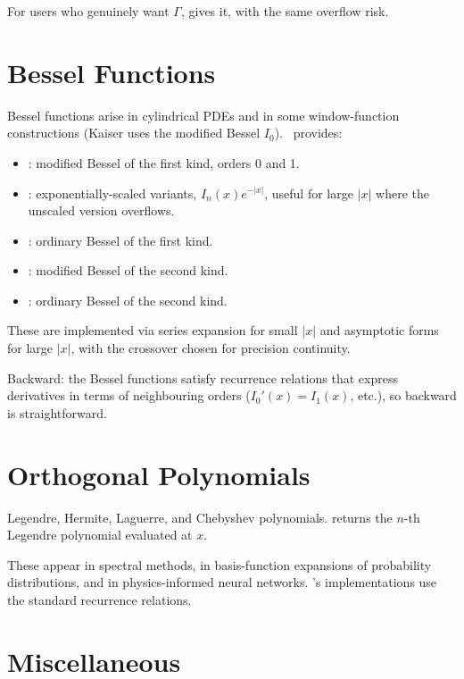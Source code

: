 For users who genuinely want $\Gamma$, 
gives it, with the same overflow risk.

\section{Bessel Functions}
\label{sec:special_functions:bessel}

Bessel functions arise in cylindrical PDEs and in some
window-function constructions (Kaiser uses the modified Bessel
$I_0$). \Lucid\ provides:

\begin{itemize}
  \item {}: modified Bessel of the first kind,
    orders 0 and 1.
  \item {}: exponentially-scaled variants,
    $I_n(x) e^{-|x|}$, useful for large $|x|$ where the
    unscaled version overflows.
  \item {}: ordinary Bessel of the first kind.
  \item {}: modified Bessel of the second kind.
  \item {}: ordinary Bessel of the second kind.
\end{itemize}

These are implemented via series expansion for small $|x|$ and
asymptotic forms for large $|x|$, with the crossover chosen for
precision continuity.

Backward: the Bessel functions satisfy recurrence relations that
express derivatives in terms of neighbouring orders
($I_0'(x) = I_1(x)$, etc.), so backward is straightforward.

\section{Orthogonal Polynomials}
\label{sec:special_functions:orthogonal}

Legendre, Hermite, Laguerre, and Chebyshev polynomials.
 returns the $n$-th Legendre polynomial
evaluated at $x$.

These appear in spectral methods, in basis-function expansions
of probability distributions, and in physics-informed neural
networks. \Lucid's implementations use the standard recurrence
relations.

\section{Miscellaneous}
\label{sec:special_functions:misc}

